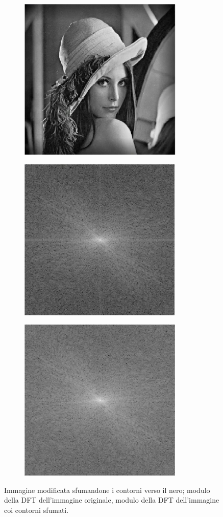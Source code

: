 \documentclass[a4paper,11pt]{article}
\begin{document}
\renewcommand{\thefigure}{6.1}
\begin{figure}[!h]
\centering
\begin{subfigure}{.33\textwidth}
  \centering
  \includegraphics[scale=0.4]{images/6/lena_black_margin.png}
\end{subfigure}%
\begin{subfigure}{.33\textwidth}
  \centering
  \includegraphics[scale=0.4]{images/6/dft_lena.png}
\end{subfigure}%
\begin{subfigure}{.33\textwidth}
  \centering
  \includegraphics[scale=0.4]{images/6/dft_lena_black_margin.png}
\end{subfigure}
\caption{Immagine modificata sfumandone i contorni verso il nero; modulo della DFT dell'immagine originale, modulo della DFT dell'immagine coi contorni sfumati.}
\end{figure}
\end{document}
